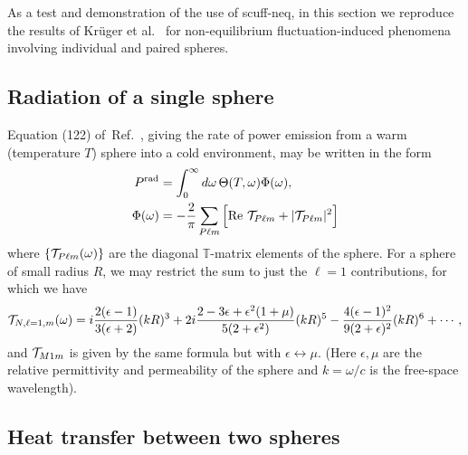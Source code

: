 \documentclass[letterpaper]{article}
\newcommand{\citeasnoun}[1]{Ref.~\citenum{#1}}
\begin{document}
As a test and demonstration of the use of {\sc scuff-neq},
in this section we reproduce the results of
Kr\"uger et al.~\cite{Kruger2012} for non-equilibrium
fluctuation-induced phenomena involving individual and paired spheres.

\subsection{Radiation of a single sphere}

Equation (122) of~\citeasnoun{Kruger2012},
giving the rate of power emission from a warm
(temperature $T$) sphere into a cold environment, 
may be written in the form
\begin{align*}
 P^{\text{\scriptsize rad}} 
  &= 
 \int_0^\infty d\omega \, \Theta(T,\omega) \Phi(\omega),
\\
 \Phi(\omega) 
 &= 
  -\frac{2}{\pi}\sum_{P \ell m}
 \Big[ \text{Re }\mathcal{T}_{P \ell m} + |\mathcal{T}_{P \ell m}|^2\Big]
\end{align*}
where $\{\mathcal{T}_{P \ell m}(\omega)\}$ are the 
diagonal $\mathbb T$-matrix elements of the sphere.
For a sphere of small radius $R$,
we may restrict the sum to just the 
$\ell=1$ contributions, for which 
we have~\cite{Kruger2012}
$$ \mathcal{T}_{N, \ell=1, m}(\omega)
   =   i\frac{2(\epsilon-1)}{3(\epsilon+2)}(kR)^3
     +2i\frac{2-3\epsilon+\epsilon^2(1+\mu)}
             {5(2+\epsilon^2)}(kR)^5
     -\frac{4(\epsilon-1)^2}{9(2+\epsilon)^2}(kR)^6
   + \cdots,
$$
and $\mathcal{T}_{M1m}$ is given by the same formula but 
with $\epsilon \leftrightarrow \mu$.
(Here $\epsilon, \mu$ are the relative
permittivity and permeability of the sphere and 
$k=\omega/c$ is the free-space wavelength).

\subsection{Heat transfer between two spheres}
\end{document}
